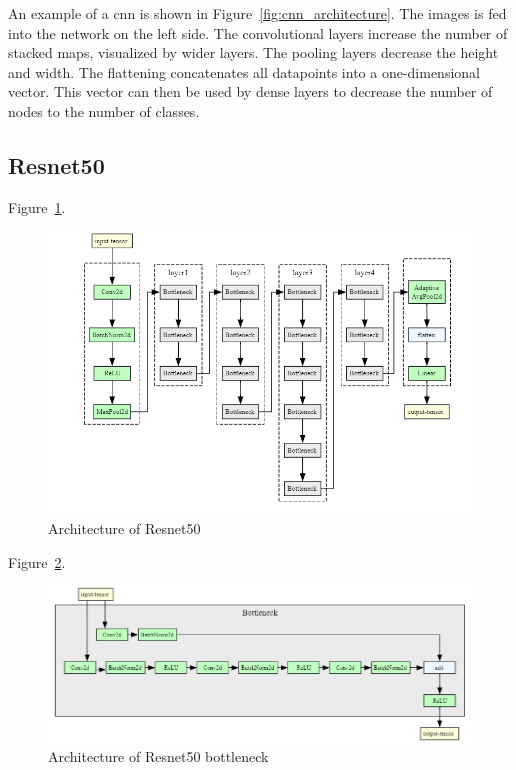 An example of a \gls{cnn} is shown in Figure~\ref{fig:cnn_architecture}. The images is fed into the network on the left side. The convolutional layers increase the number of stacked maps, visualized by wider layers. The pooling layers decrease the height and width. The flattening concatenates all datapoints into a one-dimensional vector. This vector can then be used by dense layers to decrease the number of nodes to the number of classes.


\subsection{Resnet50}
Figure~\ref{fig:resnet50_architecture}.

\begin{figure}[H]
    \begin{center}
    \includegraphics[width=15cm]{../images/resnet50_architecture.png}
    \caption{Architecture of Resnet50}\label{fig:resnet50_architecture}
    \end{center}
\end{figure}

Figure~\ref{fig:resnet50_architecture_bottleneck}.

\begin{figure}[H]
    \begin{center}
    \includegraphics[width=15cm]{../images/resnet50_architecture_bottleneck.png}
    \caption{Architecture of Resnet50 bottleneck}\label{fig:resnet50_architecture_bottleneck}
    \end{center}
\end{figure}

